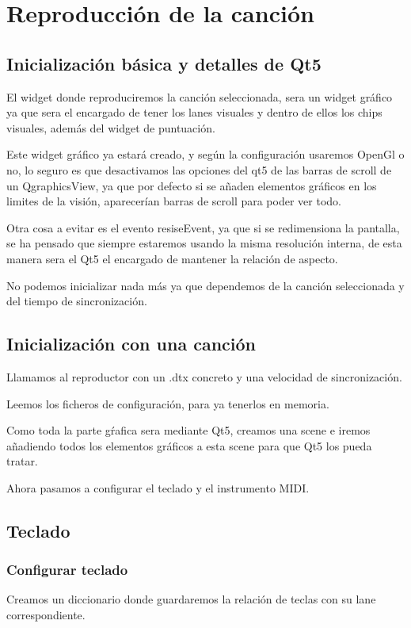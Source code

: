 \documentclass[a4paper,11pt,oneside]{book}
\begin{document}
\section{Reproducción de la canción}

\subsection{Inicialización básica y detalles de Qt5}
El widget donde reproduciremos la canción seleccionada, sera un widget gráfico ya que sera el encargado de tener los lanes visuales y dentro de ellos los chips visuales, además del widget de puntuación.

Este widget gráfico ya estará creado, y según la configuración usaremos OpenGl o no, lo seguro es que desactivamos las opciones del qt5 de las barras de scroll de un QgraphicsView, ya que por defecto si se añaden elementos gráficos en los limites de la visión, aparecerían barras de scroll para poder ver todo.

Otra cosa a evitar es el evento resiseEvent, ya que si se redimensiona la pantalla, se ha pensado que siempre estaremos usando la misma resolución interna, de esta manera sera el Qt5 el encargado de mantener la relación de aspecto.

No podemos inicializar nada más ya que dependemos de la canción seleccionada y del tiempo de sincronización.

\subsection{Inicialización con una canción}
Llamamos al reproductor con un .dtx concreto y una velocidad de sincronización.

Leemos los ficheros de configuración, para ya tenerlos en memoria.

Como toda la parte gŕafica sera mediante Qt5, creamos una scene e iremos añadiendo todos los elementos gráficos a esta scene para que Qt5 los pueda tratar.

Ahora pasamos a configurar el teclado y el instrumento MIDI.

\subsection{Teclado}
\subsubsection{Configurar teclado}
Creamos un diccionario donde guardaremos la relación de teclas con su lane correspondiente.
\end{document}
